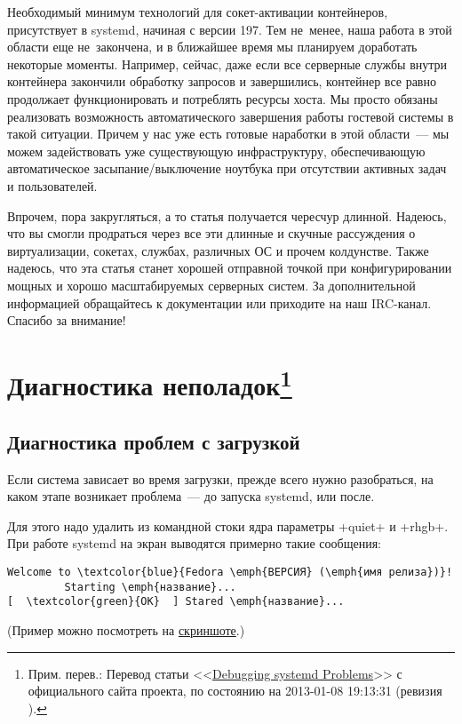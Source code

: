 \documentclass[10pt,oneside,a4paper]{article}
\newcommand{\sfnote}[1]{\texorpdfstring{\protect\footnote%
	{Прим. перев.: #1}}{}}
\begin{document}
Необходимый минимум технологий для сокет-активации контейнеров, присутствует в
systemd, начиная с версии 197. Тем не~менее, наша работа в этой области еще
не~закончена, и в ближайшее время мы планируем доработать некоторые моменты.
Например, сейчас, даже если все серверные службы внутри контейнера
закончили обработку запросов и завершились, контейнер все равно продолжает
функционировать и потреблять ресурсы хоста. Мы просто обязаны реализовать
возможность автоматического завершения работы гостевой системы в такой ситуации.
Причем у нас уже есть готовые наработки в этой области~--- мы можем
задействовать уже существующую инфраструктуру, обеспечивающую автоматическое
засыпание/выключение ноутбука при отсутствии активных задач и пользователей.

Впрочем, пора закругляться, а то статья получается чересчур длинной. Надеюсь,
что вы смогли продраться через все эти длинные и скучные рассуждения о
виртуализации, сокетах, службах, различных ОС и прочем колдунстве. Также
надеюсь, что эта статья станет хорошей отправной точкой при конфигурировании
мощных и хорошо масштабируемых серверных систем. За дополнительной информацией
обращайтесь к документации или приходите на наш IRC-канал. Спасибо за внимание!

\appendix

\section{Диагностика неполадок\sfnote{Перевод статьи
<<\href{http://freedesktop.org/wiki/Software/systemd/Debugging}{Debugging
systemd Problems}>> с официального сайта проекта, по состоянию на 2013-01-08
19:13:31 (ревизия \No26).}}

\subsection{Диагностика проблем с загрузкой}

Если система зависает во время загрузки, прежде всего нужно разобраться, на
каком этапе возникает проблема~--- до запуска systemd, или после.

Для этого надо удалить из командной стоки ядра параметры +quiet+ и +rhgb+. При
работе systemd на экран выводятся примерно такие сообщения:
\begin{Verbatim}[commandchars=\\\{\}]
Welcome to \textcolor{blue}{Fedora \emph{ВЕРСИЯ} (\emph{имя релиза})}!
         Starting \emph{название}...
[  \textcolor{green}{OK}  ] Stared \emph{название}...
\end{Verbatim}
(Пример можно посмотреть на
\href{http://freedesktop.org/wiki/Software/systemd/Debugging?action=AttachFile&do=view&target=f17boot.png}{скриншоте}.)
\end{document}
